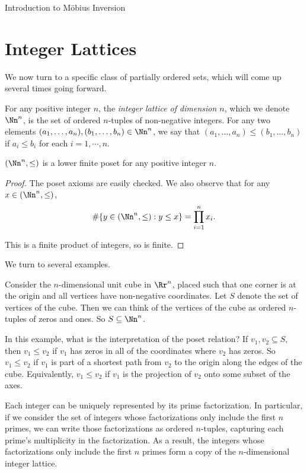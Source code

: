 \documentclass[12pt]{pom_thesis}
\begin{document}
\begin{chapter}{Introduction to M\"obius Inversion}
\section{Integer Lattices}
We now turn to a specific class of partially ordered sets, which will come up several times going forward.
\begin{defn}\label{lattice}
For any positive integer $n$, the \emph{integer lattice of dimension $n$}, which we denote $\Nn^n$, is the set of ordered $n$-tuples of non-negative integers. For any two elements $(a_1,\dots,a_n), (b_1,\dots,b_n) \in \Nn^n$, we say that $(a_1,\dots,a_n)\leq (b_1,\dots,b_n)$ if $a_i \leq b_i$ for each $i = 1,\cdots,n$.
\end{defn}
\begin{lemma}
$(\Nn^n, \leq)$ is a lower finite poset for any positive integer $n$. 
\end{lemma}
\begin{proof}
The poset axioms are easily checked. We also observe that for any $x \in (\Nn^n, \leq)$,
\[
\#\{y \in (\Nn^n, \leq):y \leq x\} = \prod_{i =1}^n x_i.
\]

This is a finite product of integers, so is finite.
\end{proof}

We turn to several examples.
\begin{examp}
Consider the $n$-dimensional unit cube in $\Rr^n$, placed such that one corner is at the origin and all vertices have non-negative coordinates. Let $S$ denote the set of vertices of the cube. Then we can think of the vertices of the cube as ordered $n$-tuples of zeros and ones. So $S \subseteq \Nn^{n}$. 

In this example, what is the interpretation of the poset relation? If $v_1, v_2 \subseteq S$, then $v_1 \leq v_2$ if $v_1$ has zeros in all of the coordinates where $v_2$ has zeros. So $v_1 \leq v_2$ if $v_1$ is part of a shortest path from $v_2$ to the origin along the edges of the cube. Equivalently, $v_1 \leq v_2$ if $v_1$ is the projection of $v_2$ onto some subset of the axes. 
\end{examp}
\begin{examp}
Each integer can be uniquely represented by its prime factorization. In particular, if we consider the set of integers whose factorizations only include the first $n$ primes, we can write those factorizations as ordered $n$-tuples, capturing each prime's multiplicity in the factorization. As a result, the integers whose factorizations only include the first $n$ primes form a copy of the $n$-dimensional integer lattice. 


\end{examp}
\end{chapter}
\end{document}
